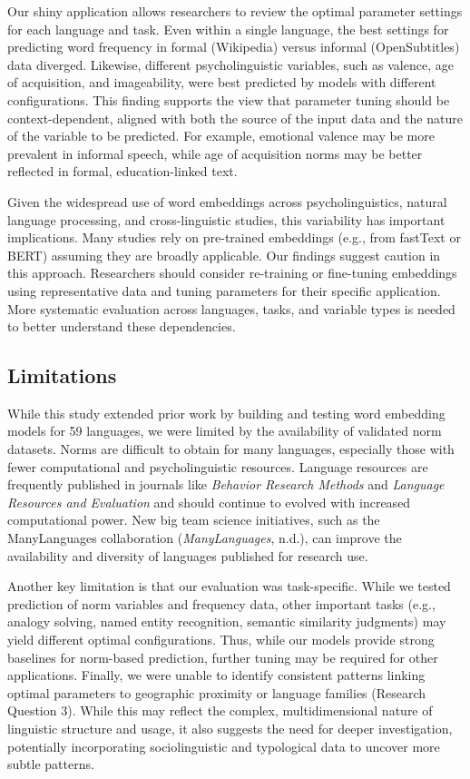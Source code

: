 \documentclass[
  english,
  man,floatsintext]{apa6}
\begin{document}
Our shiny application allows researchers to review the optimal parameter settings for each language and task. Even within a single language, the best settings for predicting word frequency in formal (Wikipedia) versus informal (OpenSubtitles) data diverged. Likewise, different psycholinguistic variables, such as valence, age of acquisition, and imageability, were best predicted by models with different configurations. This finding supports the view that parameter tuning should be context-dependent, aligned with both the source of the input data and the nature of the variable to be predicted. For example, emotional valence may be more prevalent in informal speech, while age of acquisition norms may be better reflected in formal, education-linked text.

Given the widespread use of word embeddings across psycholinguistics, natural language processing, and cross-linguistic studies, this variability has important implications. Many studies rely on pre-trained embeddings (e.g., from fastText or BERT) assuming they are broadly applicable. Our findings suggest caution in this approach. Researchers should consider re-training or fine-tuning embeddings using representative data and tuning parameters for their specific application. More systematic evaluation across languages, tasks, and variable types is needed to better understand these dependencies.

\subsection{Limitations}\label{limitations}

While this study extended prior work by building and testing word embedding models for 59 languages, we were limited by the availability of validated norm datasets. Norms are difficult to obtain for many languages, especially those with fewer computational and psycholinguistic resources. Language resources are frequently published in journals like \emph{Behavior Research Methods} and \emph{Language Resources and Evaluation} and should continue to evolved with increased computational power. New big team science initiatives, such as the ManyLanguages collaboration (\emph{ManyLanguages}, n.d.), can improve the availability and diversity of languages published for research use.

Another key limitation is that our evaluation was task-specific. While we tested prediction of norm variables and frequency data, other important tasks (e.g., analogy solving, named entity recognition, semantic similarity judgments) may yield different optimal configurations. Thus, while our models provide strong baselines for norm-based prediction, further tuning may be required for other applications. Finally, we were unable to identify consistent patterns linking optimal parameters to geographic proximity or language families (Research Question 3). While this may reflect the complex, multidimensional nature of linguistic structure and usage, it also suggests the need for deeper investigation, potentially incorporating sociolinguistic and typological data to uncover more subtle patterns.
\end{document}
